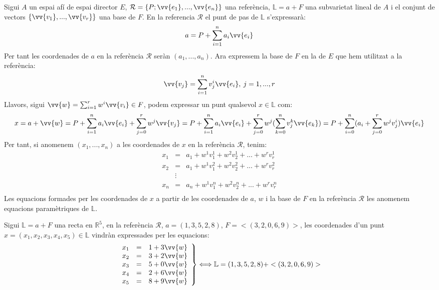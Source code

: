 \begin{defn}
	Sigui $A$ un espai afí de espai director $E$, $\mathcal{R}=\{ P;\vv{e_{1}},...,\vv{e_{n}}\}$ una referència, $\mathbb{L}=a+F$ una subvarietat lineal de $A$ i el conjunt de vectors $\{\vv{v_{1}},...,\vv{v_{r}}\}$ una base de $F$. En la referencia $\mathcal{R}$ el punt de pas de $\mathbb{L}$ s'expressarà:
	$$a=P+\sum_{i=1}^{n}a_{i}\vv{e_{i}}$$
	Per tant les coordenades de $a$ en la referència $\mathcal{R}$ seràn $(a_{1},...,a_{n})$. Ara expressem la base de $F$ en la de $E$ que hem utilitzat a la referència:
	$$\vv{v_{j}}=\sum_{i=1}^{n}v_{j}^{i}\vv{e_{i}},\: j=1,...,r$$
	Llavors, sigui $\vv{w}=\sum_{i=1}^{r}w^{i}\vv{v_{i}}\in F$, podem expressar un punt qualsevol $x\in\mathbb{L}$ com:
	$$x=a+\vv{w}=P+\sum_{i=1}^{n}a_{i}\vv{e_{i}}+\sum_{j=0}^{r}w^{j}\vv{v_{j}}=P+\sum_{i=1}^{n}a_{i}\vv{e_{i}}+\sum_{j=0}^{r}w^{j}(\sum_{k=0}^{n}v_{j}^{k}\vv{e_{k}})=P+\sum_{i=0}^{n}(a_{i}+\sum_{j=0}^{r}w^{j}v_{j}^{i})\vv{e_{i}}$$
	Per tant, si anomenem $(x_{1},...,x_{n})$ a les coordenades de $x$ en la referència $\mathcal{R}$, tenim:
	$$\begin{array}{rcl}
		x_{1}	& =		& a_{1}+w^{1}v_{1}^{1}+w^{2}v_{2}^{1}+...+w^{r}v_{r}^{1}	\\
		x_{2}	& =		& a_{1}+w^{1}v_{1}^{2}+w^{2}v_{2}^{2}+...+w^{r}v_{r}^{2}	\\
			& \vdots	&								\\
		x_{n}	& =		& a_{n}+w^{1}v_{1}^{n}+w^{2}v_{2}^{n}+...+w^{r}v_{r}^{n}	\\
	\end{array}$$
	Les equacions formades per les coordenades de $x$ a partir de les coordenades de $a$, $w$ i la base de $F$ en la referència $\mathcal{R}$ les anomenem equacions paramètriques de $\mathbb{L}$.
\end{defn}
\begin{exmp}
	Sigui $\mathbb{L}=a+F$ una recta en $\mathbb{R}^{5}$, en la referència $\mathcal{R}$, $a=(1,3,5,2,8)$, $F=<(3,2,0,6,9)>$, les coordenades d'un punt $x=(x_{1},x_{2},x_{3},x_{4},x_{5})\in\mathbb{L}$ vindràn expressades per les equacions:
	$$\left.\begin{array}{rcl}
		x_{1}	& =	& 1+3\vv{w}	\\
		x_{2}	& =	& 3+2\vv{w}	\\
		x_{3}	& =	& 5+0\vv{w}	\\
		x_{4}	& =	& 2+6\vv{w}	\\
		x_{5}	& =	& 8+9\vv{w}	\\
	\end{array}\right\}\Longleftrightarrow \mathbb{L}=(1,3,5,2,8)+<(3,2,0,6,9)>$$
\end{exmp}

